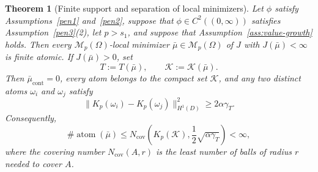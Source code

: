 \documentclass[11pt]{amsart}
\newtheorem{theorem}{Theorem}[section]
\theoremstyle{definition}
\theoremstyle{remark}
\DeclareMathOperator{\atom}{atom}
\DeclareMathOperator{\cont}{cont}
\begin{document}
\begin{theorem}[Finite support and separation of local minimizers]
\label{thm:finite_support}
Let $\phi$ satisfy Assumptions~\ref{pen1} and~\ref{pen2}, suppose that
$\phi\in C^2((0,\infty))$ satisfies Assumption~\ref{pen3}(2), let $p>s_1$,
and suppose that Assumption~\ref{ass:value-growth} holds. Then every
$\mathcal M_p(\Omega)$-local minimizer
$\bar\mu\in\mathcal M_p(\Omega)$ of $J$ with $J(\bar\mu)<\infty$ is
finite atomic. If
$J(\bar\mu)>0$, set
\begin{equation*}
	T:=T(\bar\mu),
	\qquad
	\mathcal K:=\mathcal K(\bar\mu).
\end{equation*}
Then $\bar\mu_{\cont}=0$, every atom belongs to the compact set
$\mathcal K$, and any two distinct atoms $\omega_i$ and $\omega_j$ satisfy
\begin{equation}
\label{eq:normalized-atom-separation}
	\|K_p(\omega_i)-K_p(\omega_j)\|_{H^1(D)}^2
	\geq 2\alpha\gamma_T.
\end{equation}
Consequently,
\begin{equation}
\label{eq:normalized-covering-bound}
	\#\atom(\bar\mu)
	\leq
	N_{\mathrm{cov}}\!\left(
	K_p(\mathcal K),\frac12\sqrt{\alpha\gamma_T}\right)
	<\infty,
\end{equation}
where the covering number $N_{\mathrm{cov}}(A,r)$ is the least number of
balls of radius $r$ needed to cover $A$.
\end{theorem}
\end{document}
